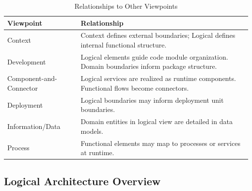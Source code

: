 \documentclass[11pt,letterpaper]{article}
\begin{document}
\begin{table}[H]
\centering
\caption{Relationships to Other Viewpoints}
\begin{tabular}{@{}L{3.5cm}L{10.5cm}@{}}
\toprule
\textbf{Viewpoint} & \textbf{Relationship} \\
\midrule
Context & Context defines external boundaries; Logical defines internal functional structure. \\
\addlinespace
Development & Logical elements guide code module organization. Domain boundaries inform package structure. \\
\addlinespace
Component-and-Connector & Logical services are realized as runtime components. Functional flows become connectors. \\
\addlinespace
Deployment & Logical boundaries may inform deployment unit boundaries. \\
\addlinespace
Information/Data & Domain entities in logical view are detailed in data models. \\
\addlinespace
Process & Functional elements may map to processes or services at runtime. \\
\bottomrule
\end{tabular}
\end{table}

\subsection{Logical Architecture Overview}
\end{document}
